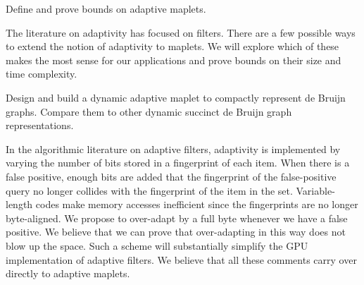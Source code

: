 \begin{rproblem}\label{rprob:adaptive-maplet}
Define and prove bounds on adaptive maplets.
\end{rproblem}
The literature on adaptivity has focused on filters.  There are a few possible ways to extend the notion of adaptivity to maplets.  We will explore which of these makes the most sense for our applications and prove bounds on their size and time complexity.

\begin{rproblem}\label{rprob:dyn-apt-filter}
Design and build a dynamic adaptive maplet to compactly represent de Bruijn graphs.  Compare them to other dynamic succinct de Bruijn graph representations.
\end{rproblem}

In the algorithmic literature on adaptive filters, adaptivity is implemented by varying the number of bits stored in a fingerprint of each item.  When there is a false positive, enough bits are added that the fingerprint of the false-positive query no longer collides with the fingerprint of the item in the set.  Variable-length codes make memory accesses inefficient since the fingerprints are no longer byte-aligned.  We propose to over-adapt by a full byte whenever we have a false positive.  We believe that we can prove that over-adapting in this way does not blow up the space.  Such a scheme will substantially simplify the GPU implementation of adaptive filters.  We believe that all these comments carry over directly to adaptive maplets.





